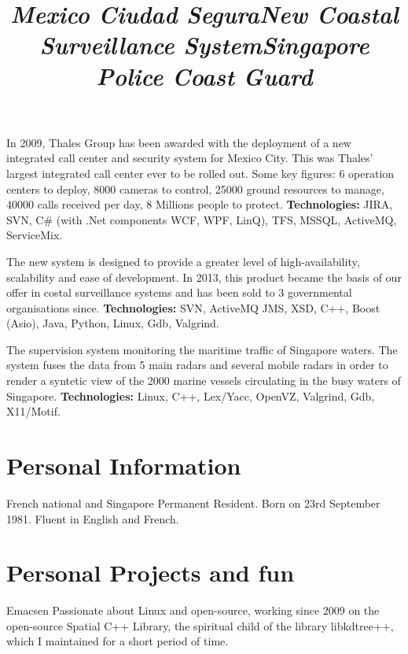 \documentclass[overlapped,line]{res}
\begin{document}
\begin{resume}
  \title{\em Mexico Ciudad Segura}
  \begin{position}
    In 2009, Thales Group has been awarded with the deployment of a new
    integrated call center and security system for Mexico City.  This was
    Thales' largest integrated call center ever to be rolled out. Some key
    figures: 6 operation centers to deploy, 8000 cameras to control, 25000
    ground resources to manage, 40000 calls received per day, 8 Millions people
    to protect.
    \newline
    {\bf Technologies:} JIRA, SVN, C\# (with .Net components WCF, WPF, LinQ), TFS, MSSQL, ActiveMQ,
    ServiceMix.
  \end{position}

  \title{\em New Coastal Surveillance System}
  \begin{position}
    The new system is designed to provide a greater level of high-availability,
    scalability and ease of development. In 2013, this product became the basis
    of our offer in costal surveillance systems and has been sold to 3
    governmental organisations since.
    \newline
    {\bf Technologies:} SVN, ActiveMQ JMS, XSD, C++, Boost (Asio), Java, Python, Linux,
    Gdb, Valgrind.
  \end{position}

  \title{\em Singapore Police Coast Guard}
  \begin{position}
    The supervision system monitoring the maritime traffic of
    Singapore waters. The system fuses the data from 5 main radars and
    several mobile radars in order to render a syntetic view of the 2000
    marine vessels circulating in the busy waters of Singapore.
    \newline
    {\bf Technologies:} Linux, C++, Lex/Yacc, OpenVZ, Valgrind, Gdb, X11/Motif.
  \end{position}


  \section{\bf Personal Information}
  French national and Singapore Permanent Resident. Born on 23rd September 1981. Fluent in English and French.


  \section{\bf Personal Projects and fun}

  Emacsen Passionate about Linux and open-source, working since 2009 on the
  open-source Spatial C++ Library, the spiritual child of the library
  libkdtree++, which I maintained for a short period of time.


\end{resume}
\end{document}
